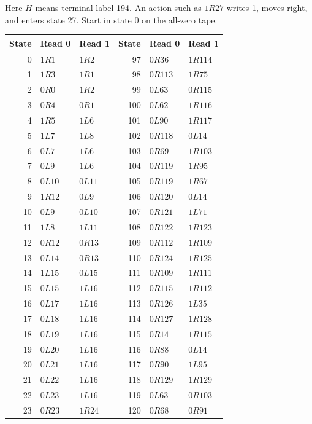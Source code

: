 \noindent Here \(H\) means terminal label 194. An action such as \(1R27\) writes 1, moves right, and enters state 27. Start in state 0 on the all-zero tape.
\small
\begin{longtable}{@{}rll@{\hspace{1.0cm}}rll@{}}
\toprule State & Read 0 & Read 1 & State & Read 0 & Read 1\\\midrule
\endhead
0 & \(1R1\) & \(1R2\) & 97 & \(0R36\) & \(1R114\)\\
1 & \(1R3\) & \(1R1\) & 98 & \(0R113\) & \(1R75\)\\
2 & \(0R0\) & \(1R2\) & 99 & \(0L63\) & \(0R115\)\\
3 & \(0R4\) & \(0R1\) & 100 & \(0L62\) & \(1R116\)\\
4 & \(1R5\) & \(1L6\) & 101 & \(0L90\) & \(1R117\)\\
5 & \(1L7\) & \(1L8\) & 102 & \(0R118\) & \(0L14\)\\
6 & \(0L7\) & \(1L6\) & 103 & \(0R69\) & \(1R103\)\\
7 & \(0L9\) & \(1L6\) & 104 & \(0R119\) & \(1R95\)\\
8 & \(0L10\) & \(0L11\) & 105 & \(0R119\) & \(1R67\)\\
9 & \(1R12\) & \(0L9\) & 106 & \(0R120\) & \(0L14\)\\
10 & \(0L9\) & \(0L10\) & 107 & \(0R121\) & \(1L71\)\\
11 & \(1L8\) & \(1L11\) & 108 & \(0R122\) & \(1R123\)\\
12 & \(0R12\) & \(0R13\) & 109 & \(0R112\) & \(1R109\)\\
13 & \(0L14\) & \(0R13\) & 110 & \(0R124\) & \(1R125\)\\
14 & \(1L15\) & \(0L15\) & 111 & \(0R109\) & \(1R111\)\\
15 & \(0L15\) & \(1L16\) & 112 & \(0R115\) & \(1R112\)\\
16 & \(0L17\) & \(1L16\) & 113 & \(0R126\) & \(1L35\)\\
17 & \(0L18\) & \(1L16\) & 114 & \(0R127\) & \(1R128\)\\
18 & \(0L19\) & \(1L16\) & 115 & \(0R14\) & \(1R115\)\\
19 & \(0L20\) & \(1L16\) & 116 & \(0R88\) & \(0L14\)\\
20 & \(0L21\) & \(1L16\) & 117 & \(0R90\) & \(1L95\)\\
21 & \(0L22\) & \(1L16\) & 118 & \(0R129\) & \(1R129\)\\
22 & \(0L23\) & \(1L16\) & 119 & \(0L63\) & \(0R103\)\\
23 & \(0R23\) & \(1R24\) & 120 & \(0R68\) & \(0R91\)\\

\end{longtable}
